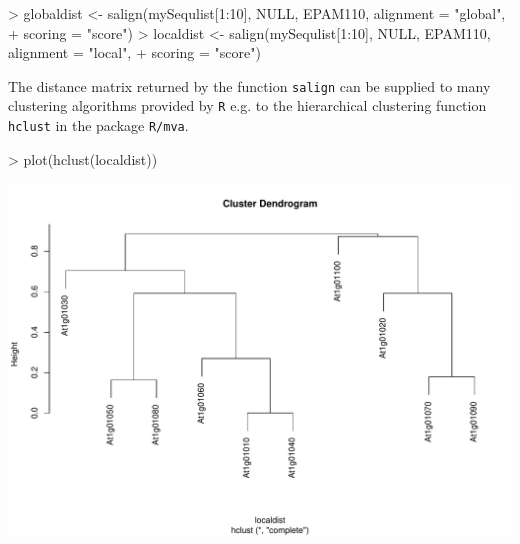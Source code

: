 \documentclass{article}
\begin{document}
\begin{Schunk}
\begin{Sinput}
> globaldist <- salign(mySequlist[1:10], NULL, EPAM110, alignment = "global", 
+     scoring = "score")
> localdist <- salign(mySequlist[1:10], NULL, EPAM110, alignment = "local", 
+     scoring = "score")
\end{Sinput}
\end{Schunk}

The distance matrix returned by the function \texttt{salign} can be supplied to many clustering algorithms provided by \texttt{R} e.g. to the hierarchical clustering function \texttt{hclust} in the package \texttt{R/mva}.

\begin{Schunk}
\begin{Sinput}
> plot(hclust(localdist))
\end{Sinput}
\end{Schunk}
\includegraphics{SamplesSession-PlostClust}
\end{document}
